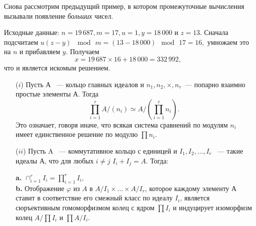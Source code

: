 \documentclass{../../template/mai_book}
\begin{document}
    \begin{beznomera}
    \hspace*{0.5cm}
    Снова рассмотрим предыдущий пример, в котором промежуточные вычисления вызывали появление \textit{больших} чисел.

    Исходные данные: $n = 19\,687, m = 17, u = 1, y = 18\,000$ и $z = 13$. Сначала подсчитаем $u(z - y)\,\mod\,m = (13 - 18\,000)\!\mod\,17 = 16,$ умножаем это на $n$ и прибавляем $y$. Получаем
    $$x = 19\,687 \times 16 + 18\,000 = 332\,992,$$
    что и является искомым решением.
    \end{beznomera}

    \begin{thm}
    \hspace*{0.01cm}
    \begin{itemize}
    \item[($i$)] Пусть А ~— кольцо главных идеалов и $n_1, n_2, \times, n_r$~— попарно взаимно простые элементы А. Тогда
    $$\prod\limits_{i=1}^{r} A/(n_i) \simeq A/(\prod\limits_{i=1}^{r} n_i).$$
    Это означает, говоря иначе, что всякая система сравнений по модулям $n_i$ имеет единственное решение по модулю $\prod n_i$.

    \item[($ii$)]Пусть A ~— коммутативное кольцо с единицей и $I_1, I_2, \ldots, I_r$ ~— такие идеалы А, что для любых $i \ne j\,\,I_i + I_j = A$. Тогда:

    {\bfseries a.\;} $\cap_{i = 1}^{r} I_i = \prod\nolimits_{i=1}^{r}I_i,$\\
    {\bfseries b.\;} Отображение $\varphi$ из $A$ в $A/I_1 \times \ldots \times A/I_r$, которое каждому элементу А ставит в соответствие его смежный класс по идеалу $I_i$, является сюръективным гомоморфизмом колец с ядром $\prod I_i$ и индуцирует изоморфизм колец $A/\prod I_i$ и $\prod A/I_i$.
    \end{itemize}
    \end{thm}
\end{document}
